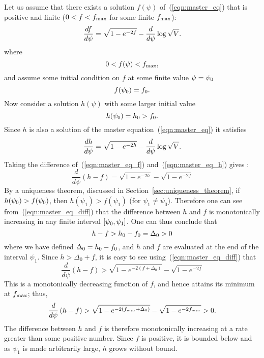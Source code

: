 Let us assume that there exists a solution $f(\psi)$ of~(\ref{eqn:master_eq}) that is positive and finite ($0<f<f_\mathrm{max}$ for some finite $f_\mathrm{max}$):
%
\begin{equation}
  \frac{d f}{d \psi} = \sqrt{1-e^{-2f}} -\frac{d}{d\psi}\log \sqrt V.
  \label{eqn:master_eq_f}
\end{equation}
%
where
%
\begin{equation}
  0<f(\psi)<f_\mathrm{max},
\end{equation}
%
and assume some initial condition on $f$ at some finite value
$\psi=\psi_0$
%
\begin{equation}
  f(\psi_0)=f_0.
\end{equation}
%
Now consider a solution $h(\psi)$ with some larger initial value
%
\begin{equation}
  h(\psi_0)=h_0>f_0.
\end{equation}
%
Since $h$ is also a solution of the master equation~(\ref{eqn:master_eq}) it satisfies
%
\begin{equation}
  \frac{d h}{d \psi} = \sqrt{1-e^{-2h}} -\frac{d}{d\psi}\log \sqrt V.
  \label{eqn:master_eq_h}
\end{equation}
%
Taking the difference of~(\ref{eqn:master_eq_f}) and~(\ref{eqn:master_eq_h}) gives :
%
\begin{equation}
  \frac{d}{d\psi}\left(h-f\right)
  = 
  \sqrt{1-e^{-2h}}-\sqrt{1-e^{-2f}}
  \label{eqn:master_eq_diff}
\end{equation}
%
By a uniqueness theorem, discussed in Section~\ref{sec:uniqueness_theorem}, if $h(\psi_0)>f(\psi_0)$, then $h(\psi_1)>f(\psi_1)$ (for $\psi_1\ne\psi_0$). Therefore one can see from~(\ref{eqn:master_eq_diff}) that the difference between $h$ and $f$ is monotonically increasing in any finite interval $[\psi_0,\psi_1]$.  One can thus conclude that
%
\begin{equation}
  h-f>h_0-f_0=\Delta_0>0
  \label{eqn:cosh_rel}
\end{equation}
%
where we have defined $\Delta_0 = h_0-f_0$, and $h$ and $f$ are evaluated at the end of the interval $\psi_1$. Since $h>\Delta_0+f$, it is easy to see using~(\ref{eqn:master_eq_diff}) that
%
\begin{equation}
  \frac{d}{d\psi}\left(h-f\right)
  > 
  \sqrt{1-e^{-2(f+\Delta_0)}}-\sqrt{1-e^{-2f}}
\end{equation}
%
This is a monotonically decreasing function of $f$, and hence attains its minimum at $f_\mathrm{max}$; thus,
%
\begin{equation}
  \frac{d}{d\psi}\left(h-f\right)
  > 
  \sqrt{1-e^{-2(f_\mathrm{max}+\Delta_0)}}-\sqrt{1-e^{-2f_\mathrm{max}}} 
  >
  0.
\end{equation}
%
The difference between $h$ and $f$ is therefore monotonically increasing at a rate greater than some positive number. Since $f$ is positive, it is bounded below and as $\psi_1$ is made arbitrarily large, $h$ grows without bound.

